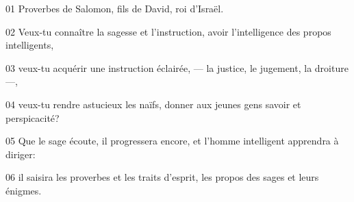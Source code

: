 01 Proverbes de Salomon, fils de David, roi d’Israël.

02 Veux-tu connaître la sagesse et l’instruction, avoir l’intelligence des propos intelligents,

03 veux-tu acquérir une instruction éclairée, --- la justice, le jugement, la droiture ---,

04 veux-tu rendre astucieux les naïfs, donner aux jeunes gens savoir et perspicacité?

05 Que le sage écoute, il progressera encore, et l’homme intelligent apprendra à diriger:

06 il saisira les proverbes et les traits d’esprit, les propos des sages et leurs énigmes.
